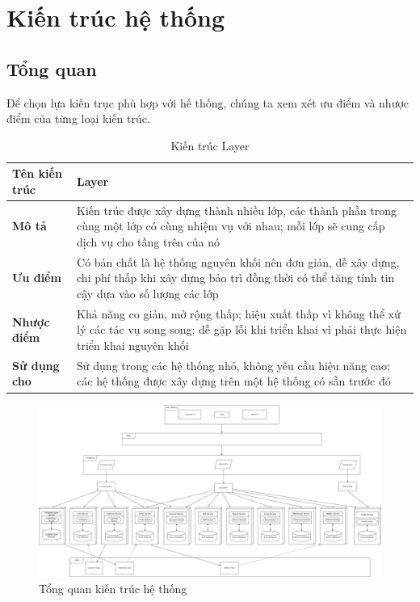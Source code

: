 
\section{Kiến trúc hệ thống}
\subsection{Tổng quan}

Để chọn lựa kiến trục phù hợp với hế thống, chúng ta xem xét ưu điểm và nhược điểm của từng loại kiến trúc.\\


\begin{table}
	\begin{tabular}{|p{3cm}|p{12cm}|}
		\hline
		\textbf{Tên kiến trúc} & Layer  \\ 
		\hline
		\textbf{Mô tả} & Kiến trúc được xây dựng thành nhiều lớp, các thành phần trong cùng một lớp có cùng nhiệm vụ với nhau; mỗi lớp sẽ cung cấp dịch vụ cho tầng trên của nó  \\ 
		\hline
		\textbf{Ưu điểm} & Có bản chất là hệ thống nguyên khối nên đơn giản, dễ xây dựng, chi phí thấp khi xây dựng bảo trì đồng thời có thể tăng tính tin cậy dựa vào số lượng các lớp     \\ 
		\hline
		\textbf{Nhược điểm} & Khả năng co giản, mở rộng thấp; hiệu xuất thấp vì không thể xử lý các tác vụ song song; dễ gặp lỗi khi triển khai vì phải thực hiện triển khai nguyên khối   \\ 
		\hline
		\textbf{Sử dụng cho} & Sử dụng trong các hệ thống nhỏ, không yêu cầu hiệu năng cao; các hệ thống được xây dựng trên một hệ thống có sẵn trước đó \\ 
		\hline
		
	\end{tabular}
	\caption{Kiến trúc Layer}
\end{table}






\begin{figure}[!htp]
	\centering
	\includegraphics[width=6in]{img/Architecture/general-architect.png}
	\newline
	\caption{Tổng quan kiến trúc hệ thống}
\end{figure}

